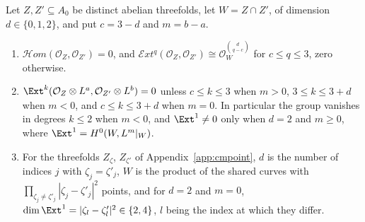 \begin{lemma}\label{lem:cmmeet}
Let $Z,Z'\subseteq A_{0}$ be distinct abelian threefolds, let $W=Z\cap Z'$, of dimension $d\in\{0,1,2\}$, and put $c=3-d$ and $m=b-a$.
\begin{enumerate}[label=\textup{(\roman*)},leftmargin=2.4em,itemsep=2pt]
\item $\mathcal{H}om(\mathcal{O}_{Z},\mathcal{O}_{Z'})=0$, and $\mathcal{E}xt^{q}(\mathcal{O}_{Z},\mathcal{O}_{Z'})\cong\mathcal{O}_{W}^{\binom{d}{q-c}}$ for $c\le q\le3$, zero otherwise.
\item $\Ext^{k}(\mathcal{O}_{Z}\otimes L^{a},\mathcal{O}_{Z'}\otimes L^{b})=0$ unless $c\le k\le3$ when $m>0$, $3\le k\le3+d$ when $m<0$, and $c\le k\le3+d$ when $m=0$. In particular the group vanishes in degrees $k\le2$ when $m<0$, and $\Ext^{1}\ne0$ only when $d=2$ and $m\ge0$, where $\Ext^{1}=H^{0}(W,L^{m}|_{W})$.
\item For the threefolds $Z_{\zeta}$, $Z_{\zeta'}$ of Appendix~\ref{app:cmpoint}, $d$ is the number of indices $j$ with $\zeta_{j}=\zeta'_{j}$, $W$ is the product of the shared curves with $\prod_{\zeta_{j}\ne\zeta'_{j}}|\zeta_{j}-\zeta'_{j}|^{2}$ points, and for $d=2$ and $m=0$, $\dim\Ext^{1}=|\zeta_{l}-\zeta'_{l}|^{2}\in\{2,4\}$, $l$ being the index at which they differ.
\end{enumerate}
\end{lemma}

